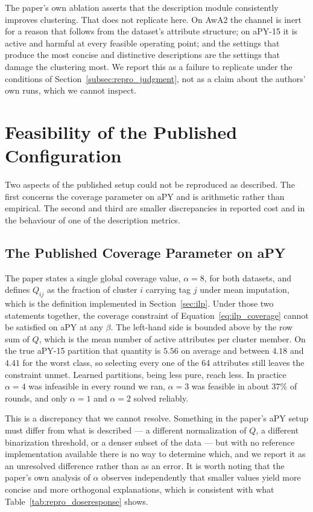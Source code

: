 The paper's own ablation asserts that the description module consistently improves clustering. That does not replicate here. On AwA2 the channel is inert for a reason that follows from the dataset's attribute structure; on aPY-15 it is active and harmful at every feasible operating point; and the settings that produce the most concise and distinctive descriptions are the settings that damage the clustering most. We report this as a failure to replicate under the conditions of Section~\ref{subsec:repro_judgment}, not as a claim about the authors' own runs, which we cannot inspect.

\section{Feasibility of the Published Configuration}
\label{sec:repro_feasibility}

Two aspects of the published setup could not be reproduced as described. The first concerns the coverage parameter on aPY and is arithmetic rather than empirical. The second and third are smaller discrepancies in reported cost and in the behaviour of one of the description metrics.

\subsection{The Published Coverage Parameter on aPY}
\label{subsec:repro_alpha8}

The paper states a single global coverage value, $\alpha = 8$, for both datasets, and defines $Q_{ij}$ as the fraction of cluster $i$ carrying tag $j$ under mean imputation, which is the definition implemented in Section~\ref{sec:ilp}. Under those two statements together, the coverage constraint of Equation~\ref{eq:ilp_coverage} cannot be satisfied on aPY at any $\beta$. The left-hand side is bounded above by the row sum of $Q$, which is the mean number of active attributes per cluster member. On the true aPY-15 partition that quantity is $5.56$ on average and between $4.18$ and $4.41$ for the worst class, so selecting every one of the 64 attributes still leaves the constraint unmet. Learned partitions, being less pure, reach less. In practice $\alpha = 4$ was infeasible in every round we ran, $\alpha = 3$ was feasible in about 37\% of rounds, and only $\alpha = 1$ and $\alpha = 2$ solved reliably.

This is a discrepancy that we cannot resolve. Something in the paper's aPY setup must differ from what is described --- a different normalization of $Q$, a different binarization threshold, or a denser subset of the data --- but with no reference implementation available there is no way to determine which, and we report it as an unresolved difference rather than as an error. It is worth noting that the paper's own analysis of $\alpha$ observes independently that smaller values yield more concise and more orthogonal explanations, which is consistent with what Table~\ref{tab:repro_doseresponse} shows.

